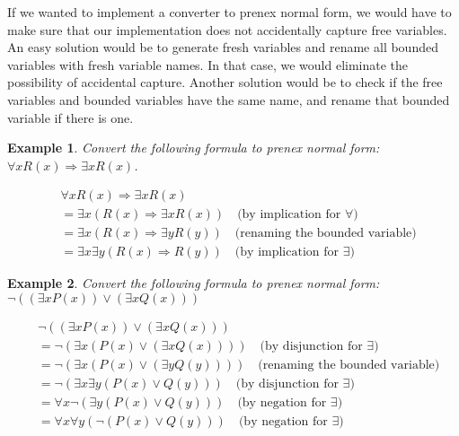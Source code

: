 \documentclass[10pt]{article}
\newtheorem{problem}{Example}
\newenvironment{solution}[1][\emph{Solution:}]{\begin{trivlist}
\item[\hskip \labelsep {\bfseries #1}]}{\end{trivlist}}
\newcommand{\imp}{\ensuremath{\Rightarrow}}
\begin{document}
If we wanted to implement a converter to prenex normal form, we would have to make sure that our implementation does not accidentally capture free variables. An easy solution would be to generate fresh variables and rename all bounded variables with fresh variable names. In that case, we would eliminate the possibility of accidental capture. Another solution would be to check if the free variables and bounded variables have the same name, and rename that bounded variable if there is one.

\begin{problem}
Convert the following formula to prenex normal form: $\forall x R(x) \imp \exists x R(x)$.
\end{problem}
\begin{solution}
\begin{align*}
& \forall x R(x) \imp \exists x R(x)\\
&= \exists x (R(x) \imp \exists x R(x)) \quad\text{(by implication for $\forall$)}\\
&= \exists x (R(x) \imp \exists y R(y)) \quad\text{(renaming the bounded variable)}\\
&= \exists x \exists y (R(x) \imp  R(y)) \quad\text{(by implication for $\exists$)}
\end{align*}
\end{solution}

\begin{problem}
Convert the following formula to prenex normal form: $\lnot ((\exists x P(x)) \lor (\exists x Q(x)))$
\end{problem}
\begin{solution}
\begin{align*}
& \lnot ((\exists x P(x)) \lor (\exists x Q(x)))\\
&= \lnot (\exists x (P(x) \lor (\exists x Q(x)))) \quad\text{(by disjunction for $\exists$)}\\
&= \lnot (\exists x (P(x) \lor (\exists y Q(y)))) \quad\text{(renaming the bounded variable)}\\
&= \lnot (\exists x \exists y (P(x) \lor Q(y))) \quad\text{(by disjunction for $\exists$)}\\
&= \forall x \lnot (\exists y (P(x) \lor Q(y))) \quad\text{(by negation for $\exists$)}\\
&= \forall x \forall y (\lnot (P(x) \lor Q(y))) \quad\text{(by negation for $\exists$)}
\end{align*}
\end{solution}

\newpage
\end{document}
